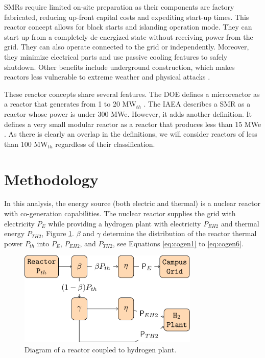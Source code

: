 \documentclass[11pt,letterpaper]{article}
\begin{document}
\glspl{SMR} require limited on-site preparation as their components are factory fabricated, reducing up-front capital costs and expediting start-up times.
This reactor concept allows for black starts and islanding operation mode.
They can start up from a completely de-energized state without receiving power from the grid.
They can also operate connected to the grid or independently.
Moreover, they minimize electrical parts and use passive cooling features to safely shutdown.
Other benefits include underground construction, which makes reactors less vulnerable to extreme weather and physical attacks \cite{us-doe_ultimate_2019}.

These reactor concepts share several features.
The \gls{DOE} defines a microreactor as a reactor that generates from 1 to 20 MW$_{th}$ \cite{us-doe_ultimate_2019}.
The \gls{IAEA} describes a \gls{SMR} as a reactor whose power is under 300 MWe.
However, it adds another definition.
It defines a very small modular reactor as a reactor that produces less than 15 MWe \cite{world_nuclear_association_small_2020}.
As there is clearly an overlap in the definitions, we will consider reactors of less than 100 MW$_{th}$ regardless of their classification.

\section{Methodology}
\label{sec:metho}

In this analysis, the energy source (both electric and thermal) is a nuclear reactor with co-generation capabilities.
The nuclear reactor supplies the grid with electricity $P_E$ while providing a hydrogen plant with electricity $P_{EH2}$ and thermal energy $P_{TH2}$, Figure \ref{fig:cogen}.
$\beta$ and $\gamma$ determine the distribution of the reactor thermal power $P_{th}$ into $P_E$, $P_{EH2}$, and $P_{TH2}$, see Equations \ref{eq:cogen1} to \ref{eq:cogen6}.

\begin{figure}[htbp!]
	\centering
	\includegraphics[height=4.5cm]{figures/hte-figure0.png}
	\hfill
	\caption{Diagram of a reactor coupled to hydrogen plant.}
	\label{fig:cogen}
\end{figure}
\end{document}
